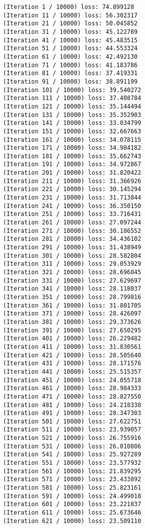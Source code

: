 \documentclass[11pt]{article}
\begin{document}
    \begin{Verbatim}[commandchars=\\\{\}]
(Iteration 1 / 10000) loss: 74.899128
(Iteration 11 / 10000) loss: 56.302317
(Iteration 21 / 10000) loss: 50.045852
(Iteration 31 / 10000) loss: 45.122789
(Iteration 41 / 10000) loss: 45.483515
(Iteration 51 / 10000) loss: 44.553324
(Iteration 61 / 10000) loss: 42.492130
(Iteration 71 / 10000) loss: 41.183786
(Iteration 81 / 10000) loss: 37.419331
(Iteration 91 / 10000) loss: 38.891199
(Iteration 101 / 10000) loss: 39.540272
(Iteration 111 / 10000) loss: 37.408784
(Iteration 121 / 10000) loss: 35.144494
(Iteration 131 / 10000) loss: 35.352903
(Iteration 141 / 10000) loss: 33.034799
(Iteration 151 / 10000) loss: 32.667663
(Iteration 161 / 10000) loss: 34.078115
(Iteration 171 / 10000) loss: 34.984182
(Iteration 181 / 10000) loss: 35.662743
(Iteration 191 / 10000) loss: 34.972867
(Iteration 201 / 10000) loss: 31.820422
(Iteration 211 / 10000) loss: 31.366926
(Iteration 221 / 10000) loss: 30.145294
(Iteration 231 / 10000) loss: 31.713844
(Iteration 241 / 10000) loss: 36.350150
(Iteration 251 / 10000) loss: 33.716431
(Iteration 261 / 10000) loss: 27.097244
(Iteration 271 / 10000) loss: 30.186552
(Iteration 281 / 10000) loss: 34.436102
(Iteration 291 / 10000) loss: 31.438949
(Iteration 301 / 10000) loss: 28.582804
(Iteration 311 / 10000) loss: 29.053929
(Iteration 321 / 10000) loss: 28.696845
(Iteration 331 / 10000) loss: 27.629697
(Iteration 341 / 10000) loss: 28.118037
(Iteration 351 / 10000) loss: 28.799816
(Iteration 361 / 10000) loss: 31.801705
(Iteration 371 / 10000) loss: 28.426097
(Iteration 381 / 10000) loss: 29.373626
(Iteration 391 / 10000) loss: 27.650295
(Iteration 401 / 10000) loss: 26.229482
(Iteration 411 / 10000) loss: 31.830561
(Iteration 421 / 10000) loss: 28.505640
(Iteration 431 / 10000) loss: 28.171576
(Iteration 441 / 10000) loss: 25.515357
(Iteration 451 / 10000) loss: 24.055718
(Iteration 461 / 10000) loss: 28.984333
(Iteration 471 / 10000) loss: 28.827550
(Iteration 481 / 10000) loss: 24.218338
(Iteration 491 / 10000) loss: 28.347303
(Iteration 501 / 10000) loss: 27.622751
(Iteration 511 / 10000) loss: 23.939057
(Iteration 521 / 10000) loss: 26.755916
(Iteration 531 / 10000) loss: 26.010806
(Iteration 541 / 10000) loss: 25.927289
(Iteration 551 / 10000) loss: 23.577932
(Iteration 561 / 10000) loss: 21.839295
(Iteration 571 / 10000) loss: 23.433892
(Iteration 581 / 10000) loss: 25.823161
(Iteration 591 / 10000) loss: 24.499018
(Iteration 601 / 10000) loss: 23.221837
(Iteration 611 / 10000) loss: 25.673646
(Iteration 621 / 10000) loss: 23.509110

\end{Verbatim}
\end{document}
